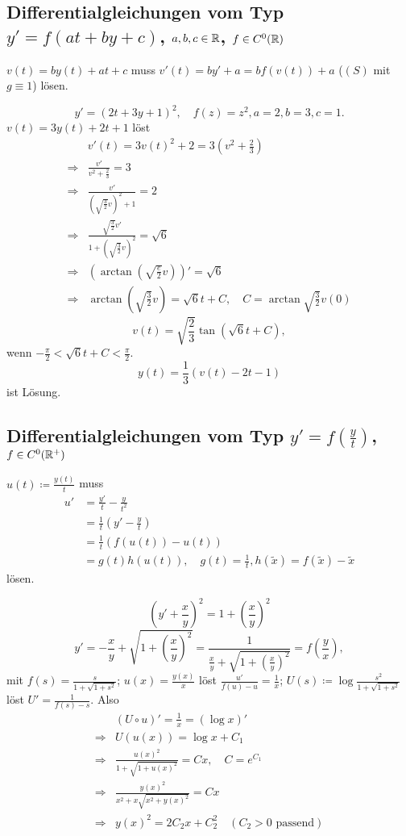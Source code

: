\subsection{Differentialgleichungen vom Typ $ y'=f(at+by+c) $, $ a,b,c\in\mathbb{R} $, $ f\in C^0(\mathbb{R}) $}
$ v(t)=by(t)+at+c $ muss $ v'(t)=by'+a=bf(v(t))+a $ ($ (S) $ mit $ g\equiv 1 $) l\"osen.
\begin{beispiel*}
	\[ y'=(2t+3y+1)^2,\quad f(z)=z^2, a=2, b=3, c=1. \]
	$ v(t)=3y(t)+2t+1 $ l\"ost \begin{align*} &v'(t)=3v(t)^2+2=3\left(v^2+\frac{2}{3}\right)\\\Rightarrow&\frac{v'}{v^2+\frac{2}{3}}=3\\\Rightarrow&\frac{v'}{\left(\sqrt{\frac{3}{2}}v\right)^2+1}=2\\\Rightarrow&\frac{\sqrt{\frac{3}{2}}v'}{1+\left(\sqrt{\frac{3}{2}}v\right)^2}=\sqrt{6}\\\Rightarrow&\left(\arctan\left(\sqrt{\frac{e}{2}}v\right)\right)'=\sqrt{6}\\\Rightarrow&\arctan\left(\sqrt{\frac{3}{2}}v\right)=\sqrt{6}t+C,\quad C=\arctan\sqrt{\frac{3}{2}}v(0) \end{align*}
	\[ v(t)=\sqrt{\frac{2}{3}}\tan(\sqrt{6}t+C), \]
	wenn $ -\frac{\pi}{2}<\sqrt{6}t+C<\frac{\pi}{2} $.
	\[ y(t)=\frac{1}{3}(v(t)-2t-1) \]
	ist L\"osung.
\end{beispiel*}
\subsection{Differentialgleichungen vom Typ $ y'=f\left(\frac{y}{t}\right) $, $ f\in C^0(\mathbb{R}^+) $}
$ u(t)\coloneqq\frac{y(t)}{t} $ muss \begin{align*} u'&=\frac{y'}{t}-\frac{y}{t^2}\\&=\frac{1}{t}\left(y'-\frac{y}{t}\right)\\&=\frac{1}{t}\left(f(u(t))-u(t)\right)\\&=g(t)h(u(t)),\quad g(t)=\frac{1}{t},h(\tilde x)=f(\tilde x)-\tilde x \end{align*}
l\"osen.
\begin{beispiel*}[Scheinwerfer]
	\[ \left(y'+\frac{x}{y}\right)^2=1+\left(\frac{x}{y}\right)^2 \]
	\[ y'=-\frac{x}{y}+\sqrt{1+\left(\frac{x}{y}\right)^2}=\frac{1}{\frac{x}{y}+\sqrt{1+\left(\frac{x}{y}\right)^2}}=f\left(\frac{y}{x}\right), \]
	mit $ f(s)=\frac{s}{1+\sqrt{1+s^2}} $; $ u(x)=\frac{y(x)}{x} $ l\"ost $ \frac{u'}{f(u)-u}=\frac{1}{x} $; $ U(s)\coloneqq\log\frac{
	s^2}{1+\sqrt{1+s^2}} $ l\"ost $ U'=\frac{1}{f(s)-s} $. Also
	\begin{align*}
	&(U\circ u)'=\frac{1}{x}=(\log x)'\\
	\Rightarrow&U(u(x))=\log x+C_1\\
	\Rightarrow&\frac{u(x)^2}{1+\sqrt{1+u(x)^2}}=Cx,\quad C=e^{C_1}\\
	\Rightarrow&\frac{y(x)^2}{x^2+x\sqrt{x^2+y(x)^2}}=Cx\\
	\Rightarrow&y(x)^2=2C_2x+C_2^2\quad(C_2>0\text{ passend})
	\end{align*}
\end{beispiel*}
